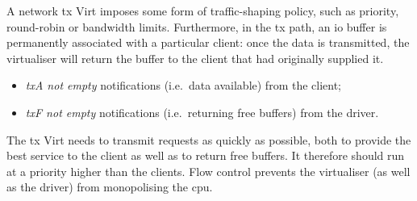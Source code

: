 \documentclass[a4paper,12pt]{report}
\newcommand{\Comment}[1]{\textbf{\textsl{#1}}}
\newcommand{\Comment}[1]{\relax}
\newcommand{\courtney}[1]{\Comment{#1 \colorbox{pink}{[Courtney]}}}
\begin{document}
A network \gls{tx} Virt imposes some form of traffic-shaping policy, such as
priority, round-robin or bandwidth limits. Furthermore, in the \gls{tx}
path, an \gls{io} buffer is permanently associated with a particular
client: once the data is transmitted, the virtualiser will return the
buffer to the client that had originally supplied it.

\begin{itemize}
\item \emph{\gls{tx}A not empty} notifications (i.e.\ data available) from
  the client;
\item \emph{\gls{tx}F not empty} notifications (i.e.\ returning free
  buffers) from the driver.
\end{itemize}

The \gls{tx} Virt needs to transmit requests as quickly as possible, both to
provide the best service to the client as well as to return free
buffers. It therefore should run at a priority higher than the
clients. Flow control prevents the virtualiser (as well as the driver)
from monopolising the \gls{cpu}.
\end{document}
